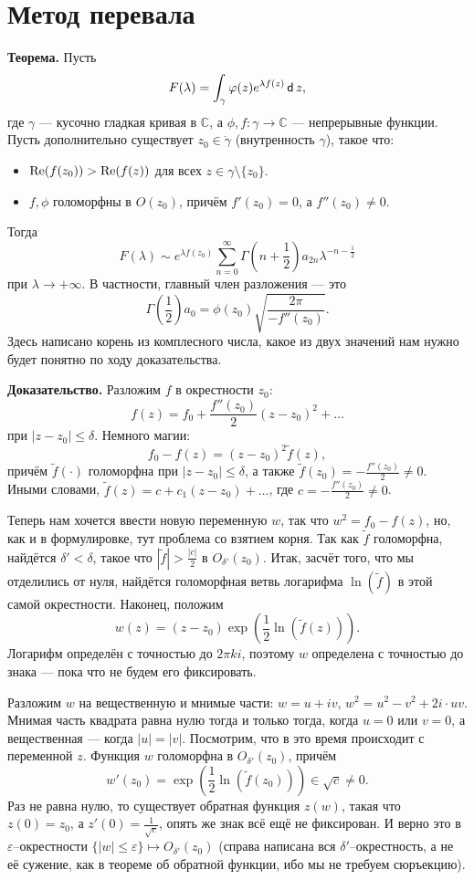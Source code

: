 \section{Метод перевала}
\textbf{Теорема.} Пусть
\[
    F(\lambda) = \int_\gamma \varphi(z) e^{\lambda f(z)} \operatorname{\mathsf d} z,
\]
где $\gamma$ --- кусочно гладкая кривая в $\mathbb C$, а $\phi, f: \gamma \to \mathbb C$ --- непрерывные функции.
Пусть дополнительно существует $z_0 \in \dot \gamma$ (внутренность $\gamma$), такое что:
\begin{itemize}
    \item $\operatorname{Re}(f(z_0)) > \operatorname{Re}(f(z))$ для всех $z \in \gamma \setminus \{z_0\}$.
    \item $f, \phi$ голоморфны в $O(z_0)$, причём $f'(z_0) = 0$, а $f''(z_0) \ne 0$.
\end{itemize}
Тогда
\[
    F(\lambda) \sim e^{\lambda f(z_0)} \sum_{n=0}^{\infty} \Gamma \left( n + \frac{1}{2} \right) a_{2n} \lambda^{-n - \frac{1}{2}}
\]
при $\lambda \to +\infty$.
В частности, главный член разложения --- это
\[
    \Gamma \left( \frac{1}{2} \right) a_0 = \phi(z_0) \sqrt{ \frac{2\pi}{-f''(z_0)} }.
\]
Здесь написано корень из комплесного числа, какое из двух значений нам нужно будет понятно по ходу доказательства.

\textbf{Доказательство.} Разложим $f$ в окрестности $z_0$:
\[
    f(z) = f_0 + \frac{f''(z_0)}{2} (z - z_0)^2 + \dots
\]
при $|z - z_0| \le \delta$.
Немного магии:
\[
    f_0 - f(z) = (z - z_0)^2 \widetilde f(z),
\]
причём $\widetilde f(\cdot)$ голоморфна при $|z - z_0| \le \delta$, а также $\widetilde f(z_0) = -\frac{f''(z_0)}{2} \ne 0$.
Иными словами, $\widetilde f(z) = c + c_1(z - z_0) + \dots$, где $c = -\frac{f''(z_0)}{2} \ne 0$.

Теперь нам хочется ввести новую переменную $w$, так что $w^2 = f_0 - f(z)$, но, как и в формулировке, тут проблема со взятием корня.
Так как $\widetilde f$ голоморфна, найдётся $\delta' < \delta$, такое что $|\widetilde f| > \frac{|c|}{2}$ в $O_{\delta'}(z_0)$.
Итак, засчёт того, что мы отделились от нуля, найдётся голоморфная ветвь логарифма $\ln(\widetilde f)$ в этой самой окрестности.
Наконец, положим 
\[
    w(z) = (z - z_0) \exp \left( \frac{1}{2} \ln(\widetilde f(z)) \right).
\]
Логарифм определён с точностью до $2 \pi k i$, поэтому $w$ определена с точностью до знака --- пока что не будем его фиксировать.

Разложим $w$ на вещественную и мнимые части: $w = u + iv$, $w^2 = u^2 - v^2 + 2i \cdot uv$.
Мнимая часть квадрата равна нулю тогда и только тогда, когда $u = 0$ или $v = 0$, а вещественная --- когда $|u| = |v|$.
Посмотрим, что в это время происходит с переменной $z$.
Функция $w$ голоморфна в $O_{\delta'}(z_0)$, причём
\[
    w'(z_0) = \exp \left( \frac{1}{2} \ln(\widetilde f(z_0)) \right) \in \sqrt c \ne 0.
\]
Раз не равна нулю, то существует обратная функция $z(w)$, такая что $z(0) = z_0$, а $z'(0) = \frac{1}{\sqrt c}$, опять же знак всё ещё не фиксирован.
И верно это в $\varepsilon$--окрестности $\{|w| \le \varepsilon\} \mapsto O_{\delta'}(z_0)$ (справа написана вся $\delta'$--окрестность, а не её сужение, как в теореме об обратной функции, ибо мы не требуем сюръекцию).

